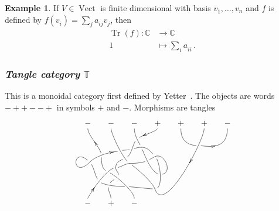 \documentclass[a4paper,12pt]{article}
\theoremstyle{definition}
\newtheorem*{Example}{Example}%
\theoremstyle{fact}
\theoremstyle{genquest}
\theoremstyle{step}
\newcommand{\CC}{\mathbb{C}}
\newcommand{\TT}{\mathbb{T}}
\newcommand{\Tr}{\operatorname{Tr}}
\newcommand{\Vect}{\operatorname{Vect}}
\newcommand{\longto}{\longrightarrow}
\begin{document}
\begin{Example} 
If $V \in \Vect $ is finite dimensional with basis $v^{}_1,\ldots,v^{}_n$ and
$f$ is defined by $f(v^{}_i) = \sum_j a^{}_{ij} v^{}_j$, then
\begin{align*}
\Tr(f) :  \CC  &\longto \CC \\
                  1 &\longmapsto \displaystyle \sum_i a^{}_{ii}\,.
\end{align*}
\end{Example}

\subsubsection*{{\it Tangle category $\TT$}}
%
This is a monoidal category first defined by Yetter~\cite{Yetter1988}. 
The objects are words $- + + - - +$ in symbols $+$ and $-$.    
Morphisms are tangles
\[
\xy
(0,20)*+!D{-}="t1";(10,20)*+!D{-}="t2";(20,20)*+!D{-}="t3";
(30,20)*+!D{+}="t4";(40,20)*+!D{+}="t5"; (50,20)*+!D{+}="t6";(60,20)*+!D{-}="t7";
(0,-10)*+!U{-}="b1";(10,-10)*+!U{+}="b2";(20,-10)*+!U{-}="b3";
"t3"+(3,-8)="a";
"t2"+(8,-15)="c";
"t3";"a"*{\hole} **\crv{"t3"+(0,-3)&"a"+(-1,2)} \POS?(.5)="b";
"t4";"b"*{\hole} **\crv{"t4"+(0,-1)&"b"+(1,1)} \POS?(.7)*\dir{>};
"t2";"c"*{\hole} **\crv{"t2"+(0,-2)&"c"+(-3,2)} \POS?(.8)="d" \POS?(.6)="e";
"b"*{\hole};"d"*{\hole} **\crv{"b"-(2,2)&"d"+(3,1)} \POS?(.5)="f";
"e"*{\hole};"f"*{\hole} **\crv{"f"};
"f"*{\hole};"a" **\crv{"f"&"a"+(-2,0)};
"e"+(-8,-2)="g";
"e"*{\hole};"g" **\crv{"e"+(1,0)&"g"+(2,1)} \POS?(.5)*\dir{<};
"t1";"g"*{\hole} **\crv{"t1"+(0,-3)&"g"+(0,3)} \POS?(.5)*\dir{<};
"d"+(-4,-4)="h";
"h"*{\hole};"b1" **\crv{"h"+(-4,0)&"b1"+(1,2)} \POS?(.5)="j" \POS?(.25)="k" \POS?(.65)*\dir{<};
"h"*{\hole};"c" **\crv{"h"+(2,0)&"c"+(-2,0)};
"d"*{\hole};"h" **\crv{"d"-(3,1)&"h"+(0,2)};
"g";"g"+(-5,-3)="i" **\crv{"g"+(-2,-1)&"i"+(2,2)};
"i";"i"*{\hole} **\crv{"i"-(8,8)&"i"+(-8,8)};
"i"*{\hole};"j"*{\hole} **\crv{"i"+(2,-2)&"j"+(-2,2)};
"g"*{\hole};"k"*{\hole} **\crv{"g"-(0,2)&"k"+(-3,1)};
"k"*{\hole};"b3" **\crv{"k"+(3,-1)&"b3"+(0,3)} \POS?(.3)="m" \POS?(.6)="l";
"j"*{\hole};"l"*{\hole} **\crv{"j"+(2,-2)&"l"+(-3,0)} \POS?(.4)="n";
"h";"m"*{\hole} **\crv{"h"-(0,2)&"m"+(2,2)};
"m"*{\hole};"n"*{\hole} **\crv{"m"-(2,2)&"n"+(1,2)};
"n"*{\hole};"b2" **\crv{"n"-(1,2)&"b2"+(0,2)};
"l"+(12,-1)="o";
"l"*{\hole};"o"*{\hole} **\crv{"l"+(2,0)&"o"+(-2,0)};
"c"*{\hole};"o" **\crv{"c"-(-3,2)&"o"+(-1,3)};
"o";"t6" **\crv{"o"+(4,-12)&"t6"-(0,5)} \POS?(.6)*\dir{<};
"a"+(6,-4)="p";
"a";"p"*{\hole} **\crv{"a"+(3,0)&"p"+(-2,2)};
"p"*{\hole};"o"*{\hole} **\crv{"p"+(2,-2)&"o"+(4,0)} \POS?(.5)="q";
"a"*{\hole};"q"*{\hole} **\crv{"a"+(1,-2)&"q"+(-4,0)} \POS?(.45)="r";
"q"*{\hole};"p" **\crv{"q"+(6,0)&"p"+(4,2)};
"p";"r"*{\hole} **\crv{"p"-(2,1)&"r"+(2,1)};
"r"*{\hole};"c" **\crv{"r"-(2,1)&"c"+(2,0)};
"t5";"t7" **i\crv{"t5"+(0,-10)&"t7"+(0,-10)} \POS?(.42)="s";
"t5";"s"*{\hole} **\crv{"t5"+(0,-5)&"s"-(5,0)};
"s"*{\hole};"t7" **\crv{"s"+(3,0)&"t7"+(0,-10)} \POS?(.5)*\dir{>}
\endxy
\]
\end{document}
